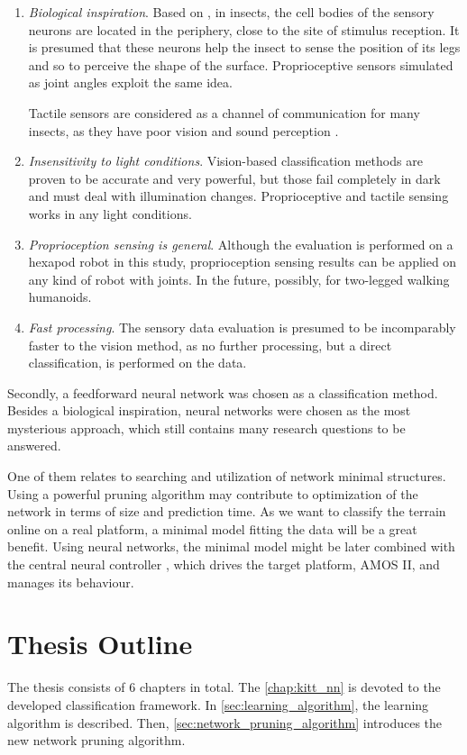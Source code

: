 \begin{enumerate}
\item \textit{Biological inspiration}. Based on \citep{article:insect}, in insects, the cell bodies of the sensory neurons are located in the periphery, close to the site of stimulus reception. It is presumed that these neurons help the insect to sense the position of its legs and so to perceive the shape of the surface. Proprioceptive sensors simulated as joint angles exploit the same idea.

Tactile sensors are considered as a channel of communication for many insects, as they have poor vision and sound perception \citep{misc:insect_tactile}. 

\item \textit{Insensitivity to light conditions}. Vision-based classification methods are proven to be accurate and very powerful, but those fail completely in dark and must deal with illumination changes. Proprioceptive and tactile sensing works in any light conditions.

\item \textit{Proprioception sensing is general}. Although the evaluation is performed on a hexapod robot in this study, proprioception sensing results can be applied on any kind of robot with joints. In the future, possibly, for two-legged walking humanoids.

\item \textit{Fast processing}. The sensory data evaluation is presumed to be incomparably faster to the vision method, as no further processing, but a direct classification, is performed on the data.
\end{enumerate}

Secondly, a feedforward neural network was chosen as a classification method. Besides a biological inspiration, neural networks were chosen as the most mysterious approach, which still contains many research questions to be answered. 

One of them relates to searching and utilization of network minimal structures. Using a powerful pruning algorithm may contribute to optimization of the network in terms of size and prediction time. As we want to classify the terrain online on a real platform, a minimal model fitting the data will be a great benefit. Using neural networks, the minimal model might be later combined with the central neural controller \citep{misc:amosii}, which drives the target platform, AMOS II, and manages its behaviour.

\section{Thesis Outline}
The thesis consists of 6 chapters in total. The \cref{chap:kitt_nn} is devoted to the developed classification framework. In \cref{sec:learning_algorithm}, the learning algorithm is described. Then, \cref{sec:network_pruning_algorithm} introduces the new network pruning algorithm.

